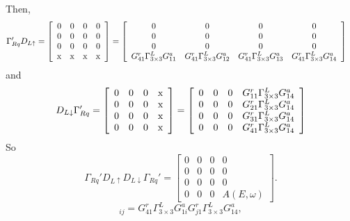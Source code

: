 \documentclass[aps,prb,onecolumn,amssymb,amsmath,superscriptaddress]{revtex4-1}
\begin{document}
Then,
\begin{equation}
\begin{split}
\Gamma_{Rq}'D_{L\uparrow} = 
\left[\begin{array}{cccc}
0 & 0 & 0 & 0 \\
0 & 0 & 0 & 0 \\
0 & 0 & 0 & 0 \\
\rm{x} & \rm{x} & \rm{x} & \rm{x}
\end{array}\right]
&= \left[\begin{array}{cccc}
0 & 0 & 0 & 0 \\
0 & 0 & 0 & 0 \\
0 & 0 & 0 & 0 \\
G_{41}^{r}\Gamma_{3\times3}^{L}G_{11}^{a} & G_{41}^{r}\Gamma_{3\times3}^{L}G_{12}^{a} & G_{41}^{r}\Gamma_{3\times3}^{L}G_{13}^{a} & G_{41}^{r}\Gamma_{3\times3}^{L}G_{14}^{a} \\
\end{array}\right]
\end{split}
\end{equation}
and
\begin{equation}
D_{L\downarrow}\Gamma_{Rq}' = 
\left[\begin{array}{cccc}
0 & 0 & 0 & \rm{x} \\
0 & 0 & 0 & \rm{x} \\
0 & 0 & 0 & \rm{x} \\
0 & 0 & 0 & \rm{x}
\end{array}\right] = 
\left[\begin{array}{cccc}
0 & 0 & 0 & G_{11}^{r}\Gamma_{3\times3}^{L}G_{14}^{a}\\
0 & 0 & 0 & G_{21}^{r}\Gamma_{3\times3}^{L}G_{14}^{a} \\
0 & 0 & 0 & G_{31}^{r}\Gamma_{3\times3}^{L}G_{14}^{a} \\
0 & 0 & 0 & G_{41}^{r}\Gamma_{3\times3}^{L}G_{14}^{a} \\
\end{array}\right]
\end{equation}
So 
\begin{equation}
\Gamma_{Rq}'D_{L\uparrow}D_{L\downarrow}\Gamma_{Rq}' = 
\left[\begin{array}{cccc}
0 & 0 & 0 & 0 \\
0 & 0 & 0 & 0 \\
0 & 0 & 0 & 0 \\
0 & 0 & 0 & A(E,\omega)
\end{array}\right].
\end{equation}
\begin{equation}
[A(E, \omega)]_{ij} = G_{41}^{r}\Gamma_{3\times3}^{L}G_{1i}^{a} G_{j1}^{r}\Gamma_{3\times3}^{L}G_{14}^{a},
\end{equation}
\end{document}

